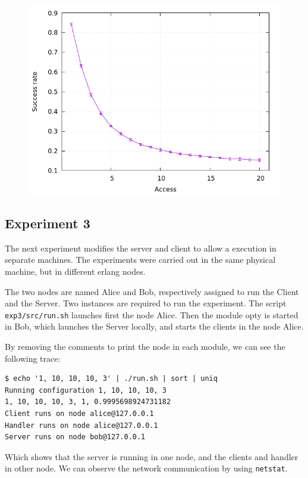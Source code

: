\documentclass[a4paper, 11pt]{article}
\begin{document}
\nopagebreak
\begin{figure}[H]
\centering
\includegraphics[width=.8\linewidth]{exp2/a/fig.png}
\end{figure}

\subsection{Experiment 3}

The next experiment modifies the server and client to allow a execution in 
separate machines. The experiments were carried out in the same physical 
machine, but in different erlang nodes.

The two nodes are named Alice and Bob, respectively assigned to run the Client 
and the Server. Two instances are required to run the experiment. The script 
\texttt{exp3/src/run.sh} launches first the node Alice. Then the module opty is 
started in Bob, which launches the Server locally, and starts the clients in the 
node Alice.

By removing the comments to print the node in each module, we can see the 
following trace:

\begin{verbatim}
$ echo '1, 10, 10, 10, 3' | ./run.sh | sort | uniq
Running configuration 1, 10, 10, 10, 3
1, 10, 10, 10, 3, 1, 0.9995698924731182
Client runs on node alice@127.0.0.1
Handler runs on node alice@127.0.0.1
Server runs on node bob@127.0.0.1
\end{verbatim}

Which shows that the server is running in one node, and the clients and handler 
in other node. We can observe the network communication by using 
\texttt{netstat}.
\end{document}
